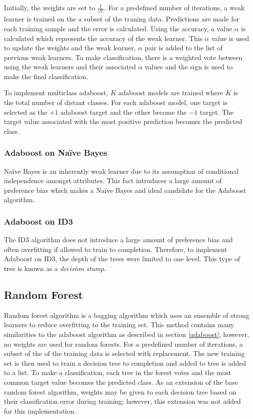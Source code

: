 \documentclass[11pt]{article}
\newcommand{\ii}{\textit}
\begin{document}
Initially, the weights are set to $\frac{1}{|S|}$. For a predefined number of iterations, a weak learner is trained on the a subset of the traning data. Predictions are made for each training sample and the error is calculated. Using the accuracy, a value $\alpha$ is calculated which represents the accuracy of the weak learner. This $\alpha$ value is used to update the weights and the weak learner, $\alpha$ pair is added to the list of previous weak learners. To make classification, there is a weighted vote between using the weak learners and their associated $\alpha$ values and the sign is used to make the final classification.

To implement multiclass adaboost, $K$ adaboost models are trained where $K$ is the total number of distant classes. For each adaboost model, one target is selected as the $+1$ adaboost target and the other become the $-1$ target. The target value associated with the most positive prediction becomes the predicted class.

\subsubsection{Adaboost on Naïve Bayes}
Naïve Bayes is an inherently weak learner due to its assumption of conditional independence amongst attributes. This fact introduces a large amount of preference bias which makes a Naïve Bayes and ideal candidate for the Adaboost algorithm.

\subsubsection{Adaboost on ID3}
The ID3 algorithm does not introduce a large amount of preference bias and often overfitting if allowed to train to completion. Therefore, to implement Adaboost on ID3, the depth of the trees were limited to one level. This type of tree is known as a \ii{decision stump}.

\subsection{Random Forest}
Random forest algorithm is a bagging algorithm which uses an ensemble of strong learners to reduce overfitting to the training set. This method contains many similarities to the adaboost algorithm as described in section \ref{adaboost}; however, no weights are used for random forests. For a predefined number of iterations, a subset of the of the training data is selected with replacement. The new training set is then used to train a decision tree to completion and added to tree is added to a list. To make a classification, each tree in the forest votes and the most common target value becomes the predicted class. As an extension of the base random forest algorithm, weights may be given to each decision tree based on their classification error during training; however, this extension was not added for this implementation.
\end{document}
